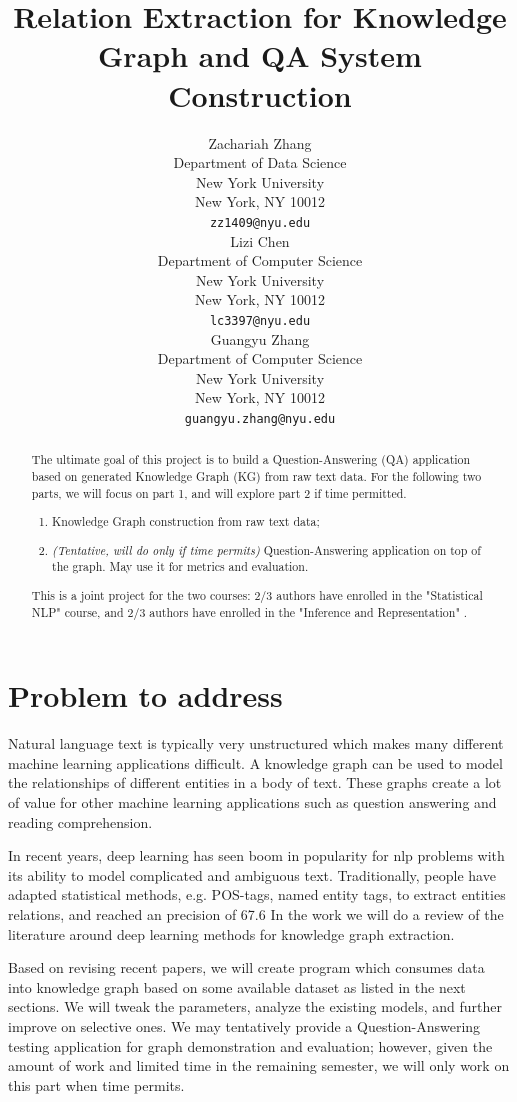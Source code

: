 \documentclass{article}
\title{Relation Extraction for Knowledge Graph and QA System Construction}
\author{
  Zachariah Zhang\\
  Department of Data Science\\
  New York University\\
  New York, NY 10012 \\
  \texttt{zz1409@nyu.edu} \\
  \And
  Lizi Chen\\
  Department of Computer Science\\
  New York University\\
  New York, NY 10012 \\
  \texttt{lc3397@nyu.edu} \\
  \And
  Guangyu Zhang\\
  Department of Computer Science\\
  New York University\\
  New York, NY 10012 \\
  \texttt{guangyu.zhang@nyu.edu} \\
}
\begin{document}

\maketitle

\begin{abstract}
	The ultimate goal of this project is to build a Question-Answering (QA) application based on generated Knowledge Graph (KG) from raw text data. For the following two parts, we will focus on part 1, and will explore part 2 if time permitted.
	 \begin{enumerate}
	 	\item Knowledge Graph construction from raw text data;
	 	\item \emph{(Tentative, will do only if time permits)} Question-Answering application on top of the graph. May use it for metrics and evaluation.
 	\end{enumerate}
 
	This is a joint project for the two courses: 2/3 authors have enrolled in the "Statistical NLP" course, and 2/3 authors have enrolled in the "Inference and Representation" .
\end{abstract}


\section{Problem to address}

	Natural language text is typically very unstructured which makes many different machine learning applications difficult. A knowledge graph can be used to model the relationships of different entities in a body of text. These graphs create a lot of value for other machine learning applications such as question answering and reading comprehension. 
	
	In recent years, deep learning has seen boom in popularity for nlp problems with its ability to model complicated and ambiguous text. Traditionally, people have adapted statistical methods, e.g. POS-tags, named entity tags, to extract entities relations, and reached an precision of 67.6%
	In the work we will do a review of the literature around deep learning methods for knowledge graph extraction. 
	
	Based on revising recent papers, we will create program which consumes data into knowledge graph based on some available dataset as listed in the next sections. We will tweak the parameters, analyze the existing models, and further improve on selective ones. We may tentatively provide a Question-Answering testing application for graph demonstration and evaluation; however, given the amount of work and limited time in the remaining semester, we will only work on this part when time permits.
  
\end{document}
